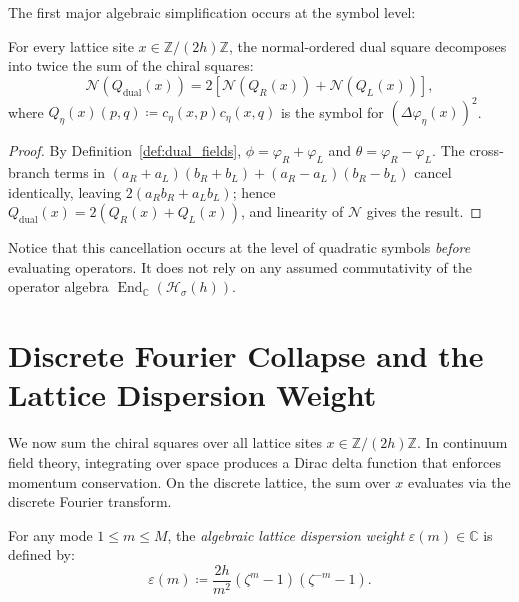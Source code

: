 The first major algebraic simplification occurs at the symbol level:

\begin{lemma}
\label{lem:field_chiral_separation}
For every lattice site $x \in \mathbb{Z}/(2h)\mathbb{Z}$, the normal-ordered dual square decomposes into twice the sum of the chiral squares:
\begin{equation}
\mathcal{N}(Q_{\mathrm{dual}}(x)) = 2 \left[ \mathcal{N}(Q_R(x)) + \mathcal{N}(Q_L(x)) \right],
\end{equation}
where $Q_\eta(x)(p, q) \coloneqq c_\eta(x, p) c_\eta(x, q)$ is the symbol for $(\Delta \varphi_\eta(x))^2$.
\end{lemma}

\begin{proof}
By Definition~\ref{def:dual_fields}, $\phi = \varphi_R + \varphi_L$ and $\theta = \varphi_R - \varphi_L$. The cross-branch terms in $(a_R+a_L)(b_R+b_L)+(a_R-a_L)(b_R-b_L)$ cancel identically, leaving $2(a_Rb_R+a_Lb_L)$; hence $Q_{\mathrm{dual}}(x)=2(Q_R(x)+Q_L(x))$, and linearity of $\mathcal{N}$ gives the result.
\end{proof}

Notice that this cancellation occurs at the level of quadratic symbols \emph{before} evaluating operators. It does not rely on any assumed commutativity of the operator algebra $\operatorname{End}_{\mathbb{C}}(\mathcal{H}_\sigma(h))$.

\section{Discrete Fourier Collapse and the Lattice Dispersion Weight}

We now sum the chiral squares over all lattice sites $x \in \mathbb{Z}/(2h)\mathbb{Z}$. In continuum field theory, integrating over space produces a Dirac delta function that enforces momentum conservation. On the discrete lattice, the sum over $x$ evaluates via the discrete Fourier transform.

\begin{definition}
\label{def:lattice_dispersion_weight}
For any mode $1 \le m \le M$, the \emph{algebraic lattice dispersion weight} $\varepsilon(m) \in \mathbb{C}$ is defined by:
\begin{equation}
\varepsilon(m) \coloneqq \frac{2h}{m^2} (\zeta^m - 1)(\zeta^{-m} - 1).
\end{equation}
\end{definition}

